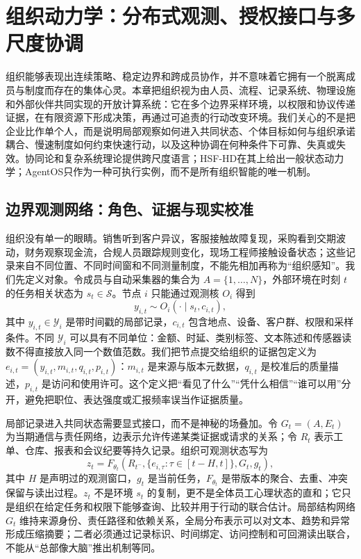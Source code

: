 \chapter{组织动力学：分布式观测、授权接口与多尺度协调}
\label{chp:organizational_geometric_dynamics}

组织能够表现出连续策略、稳定边界和跨成员协作，并不意味着它拥有一个脱离成员与制度而存在的集体心灵。本章把组织视为由人员、流程、记录系统、物理设施和外部伙伴共同实现的开放计算系统：它在多个边界采样环境，以权限和协议传递证据，在有限资源下形成决策，再通过可追责的行动改变环境。我们关心的不是把企业比作单个人，而是说明局部观察如何进入共同状态、个体目标如何与组织承诺耦合、慢速制度如何约束快速行动，以及这种协调在何种条件下可靠、失真或失效。协同论和复杂系统理论提供跨尺度语言；HSF-HD在其上给出一般状态动力学；AgentOS只作为一种可执行实例，而不是所有组织智能的唯一机制。

\section{边界观测网络：角色、证据与现实校准}
\label{sec:org_distributed_vte}

组织没有单一的眼睛。销售听到客户异议，客服接触故障复现，采购看到交期波动，财务观察现金流，合规人员跟踪规则变化，现场工程师接触设备状态；这些记录来自不同位置、不同时间窗和不同测量制度，不能先相加再称为“组织感知”。我们先定义对象。令成员与自动采集器的集合为 $A=\{1,\ldots,N\}$，外部环境在时刻 $t$ 的任务相关状态为 $s_t\in\mathcal S$。节点 $i$ 只能通过观测核 $O_i$ 得到
\begin{equation}
 y_{i,t}\sim O_i(\cdot\mid s_t,c_{i,t}),
\end{equation}
其中 $y_{i,t}\in\mathcal Y_i$ 是带时间戳的局部记录，$c_{i,t}$ 包含地点、设备、客户群、权限和采样条件。不同 $\mathcal Y_i$ 可以具有不同单位：金额、时延、类别标签、文本陈述和传感器读数不得直接放入同一个数值范数。我们把节点提交给组织的证据包定义为 $e_{i,t}=(y_{i,t},m_{i,t},q_{i,t},p_{i,t})$：$m_{i,t}$ 是来源与版本元数据，$q_{i,t}$ 是校准后的质量描述，$p_{i,t}$ 是访问和使用许可。这个定义把“看见了什么”“凭什么相信”“谁可以用”分开，避免把职位、表达强度或汇报频率误当作证据质量。

局部记录进入共同状态需要显式接口，而不是神秘的场叠加。令 $G_t=(A,E_t)$ 为当期通信与责任网络，边表示允许传递某类证据或请求的关系；令 $R_t$ 表示工单、仓库、报表和会议纪要等持久记录。组织可观测状态写为
\begin{equation}
 z_t=F_{\theta_t}\!\left(R_{t^-},\{e_{i,\tau}:\tau\in[t-H,t]\},G_t,g_t\right),
\end{equation}
其中 $H$ 是声明过的观测窗口，$g_t$ 是当前任务，$F_{\theta_t}$ 是带版本的聚合、去重、冲突保留与读出过程。$z_t$ 不是环境 $s_t$ 的复制，更不是全体员工心理状态的直和；它只是组织在给定任务和权限下能够查询、比较并用于行动的联合估计。局部结构网络 $G_t$ 维持来源身份、责任路径和依赖关系，全局分布表示可以对文本、趋势和异常形成压缩摘要；二者必须通过记录标识、时间绑定、访问控制和可回溯读出联合，不能从“总部像大脑”推出机制等同。

